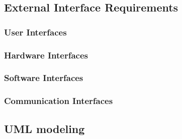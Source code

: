 \subsection{External Interface Requirements}
	\subsubsection{User Interfaces}
	\subsubsection{Hardware Interfaces}
	\subsubsection{Software Interfaces}
	\subsubsection{Communication Interfaces}
\subsection{UML modeling}
